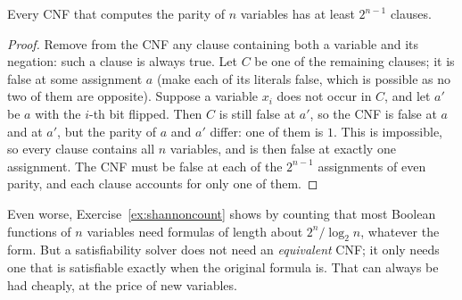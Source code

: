 \begin{proposition}\label{prop:parity}
Every CNF that computes the parity of $n$ variables has at least $2^{n-1}$ clauses.
\end{proposition}
\begin{proof}
Remove from the CNF any clause containing both a variable and its negation: such a clause is always true. Let $C$ be one
of the remaining clauses; it is false at some assignment $a$ (make each of its literals false, which is possible as no
two of them are opposite). Suppose a variable $x_i$ does not occur in $C$, and let $a'$ be $a$ with the $i$-th bit flipped.
Then $C$ is still false at $a'$, so the CNF is false at $a$ and at $a'$, but the parity of $a$ and $a'$ differ: one of them is
$1$. This is impossible, so every clause contains all $n$ variables, and is then false at exactly one assignment. The
CNF must be false at each of the $2^{n-1}$ assignments of even parity, and each clause accounts for only one of
them.
\end{proof}

Even worse, Exercise~\ref{ex:shannoncount} shows by counting that most Boolean functions of $n$ variables need formulas
of length about $2^n/\log_2n$, whatever the form. But a satisfiability solver does not need an \emph{equivalent} CNF; it only
needs one that is satisfiable exactly when the original formula is. That can always be had cheaply, at the price of
new variables.

